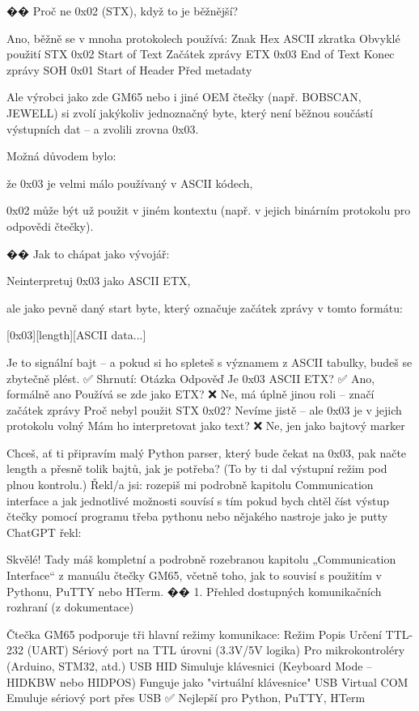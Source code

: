 �� Proč ne 0x02 (STX), když to je běžnější?

Ano, běžně se v mnoha protokolech používá:
Znak	Hex	ASCII zkratka	Obvyklé použití
STX	0x02	Start of Text	Začátek zprávy
ETX	0x03	End of Text	Konec zprávy
SOH	0x01	Start of Header	Před metadaty

Ale výrobci jako zde GM65 nebo i jiné OEM čtečky (např. BOBSCAN, JEWELL) si zvolí jakýkoliv jednoznačný byte, který není běžnou součástí výstupních dat – a zvolili zrovna 0x03.

Možná důvodem bylo:

    že 0x03 je velmi málo používaný v ASCII kódech,

    0x02 může být už použit v jiném kontextu (např. v jejich binárním protokolu pro odpovědi čtečky).

�� Jak to chápat jako vývojář:

    Neinterpretuj 0x03 jako ASCII ETX,

    ale jako pevně daný start byte, který označuje začátek zprávy v tomto formátu:

[0x03][length][ASCII data...]

Je to signální bajt – a pokud si ho spleteš s významem z ASCII tabulky, budeš se zbytečně plést.
✅ Shrnutí:
Otázka	Odpověď
Je 0x03 ASCII ETX?	✅ Ano, formálně ano
Používá se zde jako ETX?	❌ Ne, má úplně jinou roli – značí začátek zprávy
Proč nebyl použit STX 0x02?	Nevíme jistě – ale 0x03 je v jejich protokolu volný
Mám ho interpretovat jako text?	❌ Ne, jen jako bajtový marker

Chceš, ať ti připravím malý Python parser, který bude čekat na 0x03, pak načte length a přesně tolik bajtů, jak je potřeba? (To by ti dal výstupní režim pod plnou kontrolu.)
Řekl/a jsi:
rozepiš mi podrobně kapitolu Communication interface a jak jednotlivé možnosti souvísí s tím pokud bych chtěl číst výstup čtečky pomocí programu třeba pythonu nebo nějakého nastroje jako je putty
ChatGPT řekl:

Skvělé! Tady máš kompletní a podrobně rozebranou kapitolu „Communication Interface“ z manuálu čtečky GM65, včetně toho, jak to souvisí s použitím v Pythonu, PuTTY nebo HTerm.
�� 1. Přehled dostupných komunikačních rozhraní (z dokumentace)

Čtečka GM65 podporuje tři hlavní režimy komunikace:
Režim	Popis	Určení
TTL-232 (UART)	Sériový port na TTL úrovni (3.3V/5V logika)	Pro mikrokontroléry (Arduino, STM32, atd.)
USB HID	Simuluje klávesnici (Keyboard Mode – HIDKBW nebo HIDPOS)	Funguje jako "virtuální klávesnice"
USB Virtual COM	Emuluje sériový port přes USB	✅ Nejlepší pro Python, PuTTY, HTerm

